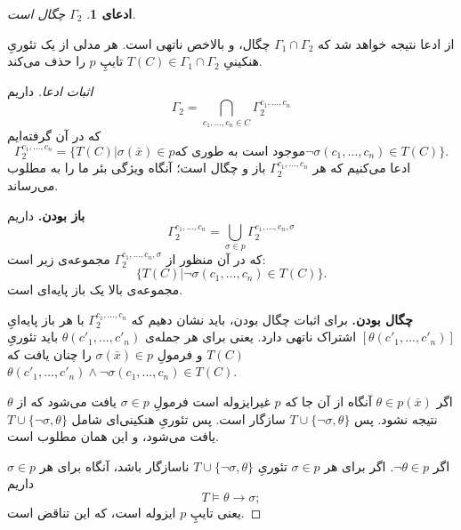 \documentclass[12pt,a4paper]{article}
\theoremstyle{colorhead}
\newtheorem{claim}[thm]{ادعای}
\begin{document}
\begin{claim}
$\Gamma_2$
چگال است.
\end{claim}
از ادعا نتیجه خواهد شد که 
$\Gamma_1\cap \Gamma_2$
چگال، و بالاخص ناتهی است. هر مدلی از 
یک تئوریِ هنکینیِ
$T(C)\in \Gamma_1\cap \Gamma_2$
تایپِ 
$p$
را حذف می‌کند. 
\begin{proof}[اثبات ادعا]
داریم
\[
\Gamma_2=\bigcap_{c_1,\ldots,c_n\in C} \Gamma_2^{c_1,\ldots,c_n}
\]
که در آن گرفته‌ایم
\[
\Gamma_2^{c_1,\ldots,c_n}=\{T(C)|
\text{$\sigma(\bar{x})\in p$
موجود است به  طوری که
$\neg \sigma(c_1,\ldots,c_n)\in T(C)$
}\}.
\]
ادعا می‌کنیم که هر
$\Gamma_2^{c_1,\ldots,c_n}$
باز و چگال است؛ آنگاه ویژگی بئر ما را به مطلوب می‌رساند.
\par 
\noindent
\textbf{باز بودن.}
داریم
\[
\Gamma_2^{c_1,\ldots,c_n}=\bigcup_{\sigma\in p}
\Gamma_2^{c_1,\ldots,c_n, \sigma}
\]
که در آن
منظور
از
$\Gamma_2^{c_1,\ldots,c_n, \sigma}$
مجموعه‌ی زیر است:
\[
\{T(C)|\neg \sigma(c_1,\ldots,c_n)\in T(C)\}.
\]
مجموعه‌ی بالا یک باز پایه‌ای است. 
\par \noindent
\textbf{چگال بودن.}
برای اثبات چگال بودن،‌ باید نشان دهیم که 
$\Gamma_2^{c_1,\ldots,c_n}$
با هر باز پایه‌ایِ
$[\theta(c'_1,\ldots,c'_n)]$
اشتراک ناتهی دارد.  یعنی برای هر جمله‌ی 
$\theta(c'_1,\ldots,c'_n)$
باید تئوریِ
$T(C)$
و فرمولِ
$\sigma(\bar{x})\in p$
را چنان یافت که
$\theta(c'_1,\ldots,c'_n)\wedge \neg \sigma(c_1,\ldots,c_n)\in T(C)$.
\par 
اگر 
$\theta\in p(\bar{x})$
آنگاه از آن جا که
$p$
غیرایزوله است فرمولِ
$\sigma\in p$
یافت می‌شود که از
$\theta$
نتیجه نشود. پس
$T\cup \{\neg \sigma,\theta\}$
سازگار است. پس تئوریِ هنکینی‌ای شامل
$T\cup \{\neg \sigma,\theta\}$
یافت می‌شود، و این همان مطلوب است.
\par 
اگر
$\neg\theta\in p$.
اگر برای هر
$\sigma\in p$
تئوریِ
$T\cup \{\neg \sigma,\theta\}$
ناسازگار باشد،‌ آنگاه برای هر
$\sigma\in p$
داریم
\[
T\models \theta\to \sigma;
\]
یعنی تایپِ 
$p$
ایزوله است، که این تناقض است. 
\end{proof}
\pagebreak 
\end{document}
